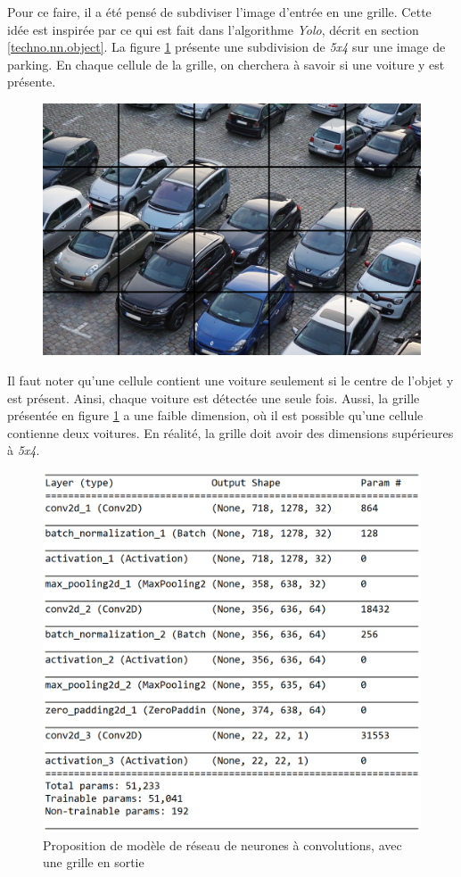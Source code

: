 Pour ce faire, il a été pensé de subdiviser l'image d'entrée en une grille. Cette idée est inspirée par ce qui est fait dans l'algorithme \textit{Yolo}, décrit en section \ref{techno.nn.object}. La figure \ref{fig:parking_grid} présente une subdivision de \textit{5x4} sur une image de parking. En chaque cellule de la grille, on cherchera à savoir si une voiture y est présente. 

\begin{figure}[ht]
    \includegraphics[width=120mm]{img/conception/parking_grid.jpg}
    \centering
    \label{fig:parking_grid} 
\end{figure}

Il faut noter qu'une cellule contient une voiture seulement si le centre de l'objet y est présent. Ainsi, chaque voiture est détectée une seule fois. Aussi, la grille présentée en figure \ref{fig:parking_grid} a une faible dimension, où il est possible qu'une cellule contienne deux voitures. En réalité, la grille doit avoir des dimensions supérieures à \textit{5x4}.

\begin{figure}[H]
    \includegraphics[width=12cm]{img/conception/nn/keras_grid.png}
    \centering
    \caption{Proposition de modèle de réseau de neurones à convolutions, avec une grille en sortie}
    \label{fig:keras_grid}
\end{figure} 

